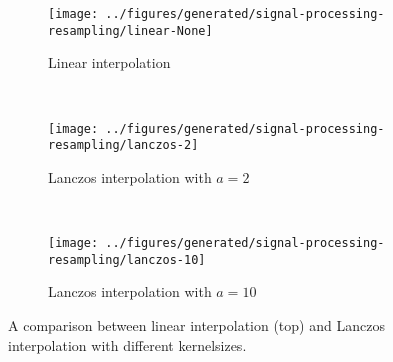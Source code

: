 %
\newpage
\begin{figure}[H]
    \begin{subfigure}{\textwidth}
        \texttt{[image: ../figures/generated/signal-processing-resampling/linear-None]}
        \caption{Linear interpolation}
    \end{subfigure}
    ~
    \begin{subfigure}{\textwidth}
        \texttt{[image: ../figures/generated/signal-processing-resampling/lanczos-2]}
        \caption{Lanczos interpolation with $a=2$}
    \end{subfigure}
    ~
    \begin{subfigure}{\textwidth}
        \texttt{[image: ../figures/generated/signal-processing-resampling/lanczos-10]}
        \caption{Lanczos interpolation with $a=10$}
    \end{subfigure}
    \caption{A comparison between linear interpolation (top) and Lanczos interpolation with different kernelsizes.}
    \label{fig:theory:signal-processing:resampling}
\end{figure}



%
%
%

